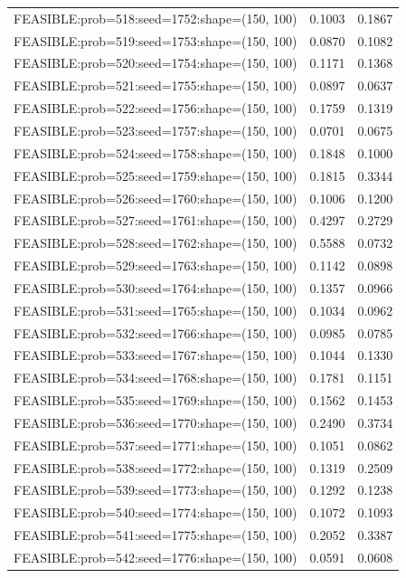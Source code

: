 \begin{longtable}{lcc}
FEASIBLE:prob=518:seed=1752:shape=(150, 100) &   0.1003 & 0.1867 \\
FEASIBLE:prob=519:seed=1753:shape=(150, 100) &   0.0870 & 0.1082 \\
FEASIBLE:prob=520:seed=1754:shape=(150, 100) &   0.1171 & 0.1368 \\
FEASIBLE:prob=521:seed=1755:shape=(150, 100) &   0.0897 & 0.0637 \\
FEASIBLE:prob=522:seed=1756:shape=(150, 100) &   0.1759 & 0.1319 \\
FEASIBLE:prob=523:seed=1757:shape=(150, 100) &   0.0701 & 0.0675 \\
FEASIBLE:prob=524:seed=1758:shape=(150, 100) &   0.1848 & 0.1000 \\
FEASIBLE:prob=525:seed=1759:shape=(150, 100) &   0.1815 & 0.3344 \\
FEASIBLE:prob=526:seed=1760:shape=(150, 100) &   0.1006 & 0.1200 \\
FEASIBLE:prob=527:seed=1761:shape=(150, 100) &   0.4297 & 0.2729 \\
FEASIBLE:prob=528:seed=1762:shape=(150, 100) &   0.5588 & 0.0732 \\
FEASIBLE:prob=529:seed=1763:shape=(150, 100) &   0.1142 & 0.0898 \\
FEASIBLE:prob=530:seed=1764:shape=(150, 100) &   0.1357 & 0.0966 \\
FEASIBLE:prob=531:seed=1765:shape=(150, 100) &   0.1034 & 0.0962 \\
FEASIBLE:prob=532:seed=1766:shape=(150, 100) &   0.0985 & 0.0785 \\
FEASIBLE:prob=533:seed=1767:shape=(150, 100) &   0.1044 & 0.1330 \\
FEASIBLE:prob=534:seed=1768:shape=(150, 100) &   0.1781 & 0.1151 \\
FEASIBLE:prob=535:seed=1769:shape=(150, 100) &   0.1562 & 0.1453 \\
FEASIBLE:prob=536:seed=1770:shape=(150, 100) &   0.2490 & 0.3734 \\
FEASIBLE:prob=537:seed=1771:shape=(150, 100) &   0.1051 & 0.0862 \\
FEASIBLE:prob=538:seed=1772:shape=(150, 100) &   0.1319 & 0.2509 \\
FEASIBLE:prob=539:seed=1773:shape=(150, 100) &   0.1292 & 0.1238 \\
FEASIBLE:prob=540:seed=1774:shape=(150, 100) &   0.1072 & 0.1093 \\
FEASIBLE:prob=541:seed=1775:shape=(150, 100) &   0.2052 & 0.3387 \\
FEASIBLE:prob=542:seed=1776:shape=(150, 100) &   0.0591 & 0.0608 \\

\end{longtable}

